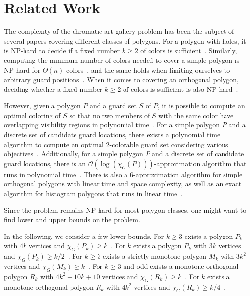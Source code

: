 \section{Related Work}
The complexity of the chromatic art gallery problem has been the subject of several papers covering different classes of polygons.
For a polygon with holes, it is NP-hard to decide if a fixed number $k \geq 2$ of colors is sufficient~\cite{fekete2014complexity}. Similarly, computing the minimum number of colors needed to cover a simple polygon is NP-hard for $\Theta(n)$ colors~\cite{fekete2014complexity}, and the same holds when limiting ourselves to arbitrary guard positions~\cite{fekete2014chromatic}. When it comes to covering an orthogonal polygon, deciding whether a fixed number $k \geq 2$ of colors is sufficient is also NP-hard~\cite{hoorfar2021np}.

However, given a polygon $P$ and a guard set $S$ of $P$, it is possible to compute an optimal coloring of $S$ so that no two members of $S$ with the same color have overlapping visibility regions in polynomial time~\cite{erickson2011many}. For a simple polygon $P$ and a discrete set of candidate guard locations, there exists a polynomial time algorithm to compute an optimal $2$-colorable guard set considering various objectives~\cite{fekete2014chromatic}. Additionally, for a simple polygon $P$ and a discrete set of candidate guard locations, there is an $\mathcal{O}(\log (\chi_G(P)))$-approximation algorithm that runs in polynomial time~\cite{fekete2014chromatic}. There is also a $6$-approximation algorithm for simple orthogonal polygons with linear time and space complexity, as well as an exact algorithm for histogram polygons that runs in linear time~\cite{hoorfar2021np}.

Since the problem remains NP-hard for most polygon classes, one might want to find lower and upper bounds on the problem.

In the following, we consider a few lower bounds.
For $k \geq 3$ exists a polygon $P_k$ with $4k$ vertices and $\chi_G(P_k) \geq k$~\cite{erickson2012art}.
For $k$ exists a polygon $P_k$ with $3k$ vertices and $\chi_G(P_k) \geq k/2$~\cite{bartschi2011coloring}.
For $k \geq 3$ exists a strictly monotone polygon $M_k$ with $3k^2$ vertices and $\chi_G(M_k) \geq k$~\cite{erickson2012art}.
For $k \geq 3$ and odd exists a monotone orthogonal polygon $R_k$ with $4k^2 + 10k + 10$ vertices and $\chi_G(R_k) \geq k$~\cite{erickson2012art}.
For $k$ exists a monotone orthogonal polygon $R_k$ with $4k^2$ vertices and $\chi_G(R_k) \geq k/4$~\cite{bartschi2011coloring}.

